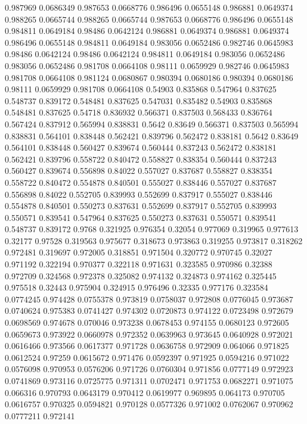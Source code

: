 0.987969 0.0686349
0.987653 0.0668776
0.986496 0.0655148
0.986881 0.0649374
0.988265 0.0665744
0.988265 0.0665744
0.987653 0.0668776
0.986496 0.0655148
0.984811 0.0649184
0.98486 0.0642124
0.986881 0.0649374
0.986881 0.0649374
0.986496 0.0655148
0.984811 0.0649184
0.983056 0.0652486
0.982746 0.0645983
0.98486 0.0642124
0.98486 0.0642124
0.984811 0.0649184
0.983056 0.0652486
0.983056 0.0652486
0.981708 0.0664108
0.98111 0.0659929
0.982746 0.0645983
0.981708 0.0664108
0.981124 0.0680867
0.980394 0.0680186
0.980394 0.0680186
0.98111 0.0659929
0.981708 0.0664108
0.54903 0.835868
0.547964 0.837625
0.548737 0.839172
0.548481 0.837625
0.547031 0.835482
0.54903 0.835868
0.548481 0.837625
0.54718 0.836932
0.566371 0.837503
0.568433 0.836764
0.567424 0.837912
0.565994 0.838831
0.5642 0.83649
0.566371 0.837503
0.565994 0.838831
0.564101 0.838448
0.562421 0.839796
0.562472 0.838181
0.5642 0.83649
0.564101 0.838448
0.560427 0.839674
0.560444 0.837243
0.562472 0.838181
0.562421 0.839796
0.558722 0.840472
0.558827 0.838354
0.560444 0.837243
0.560427 0.839674
0.556898 0.84022
0.557027 0.837687
0.558827 0.838354
0.558722 0.840472
0.554878 0.840501
0.555027 0.838446
0.557027 0.837687
0.556898 0.84022
0.552705 0.839993
0.552699 0.837917
0.555027 0.838446
0.554878 0.840501
0.550273 0.837631
0.552699 0.837917
0.552705 0.839993
0.550571 0.839541
0.547964 0.837625
0.550273 0.837631
0.550571 0.839541
0.548737 0.839172
0.9768 0.321925
0.976354 0.32054
0.977069 0.319965
0.977613 0.32177
0.97528 0.319563
0.975677 0.318673
0.973863 0.319255
0.973817 0.318262
0.972481 0.319697
0.972005 0.318851
0.971504 0.320772
0.970745 0.32027
0.971192 0.322194
0.970377 0.322118
0.971631 0.323585
0.970986 0.32388
0.972709 0.324568
0.972378 0.325082
0.974132 0.324873
0.974162 0.325445
0.975518 0.32443
0.975904 0.324915
0.976496 0.32335
0.977176 0.323584
0.0774245 0.974428
0.0755378 0.973819
0.0758037 0.972808
0.0776045 0.973687
0.0740624 0.975383
0.0741427 0.974302
0.0720873 0.974122
0.0723498 0.972679
0.0698569 0.974678
0.070046 0.973238
0.0678453 0.974155
0.0680123 0.972605
0.0659673 0.973922
0.0660978 0.972352
0.0639963 0.973645
0.0640928 0.972021
0.0616466 0.973566
0.0617377 0.971728
0.0636758 0.972909
0.064066 0.971825
0.0612524 0.97259
0.0615672 0.971476
0.0592397 0.971925
0.0594216 0.971022
0.0576098 0.970953
0.0576206 0.971726
0.0760304 0.971856
0.0777149 0.972923
0.0741869 0.973116
0.0725775 0.971311
0.0702471 0.971753
0.0682271 0.971075
0.066316 0.970793
0.0643179 0.970412
0.0619977 0.969895
0.064173 0.970705
0.0616757 0.970325
0.0594821 0.970128
0.0577326 0.971002
0.0762067 0.970962
0.0777211 0.972141
